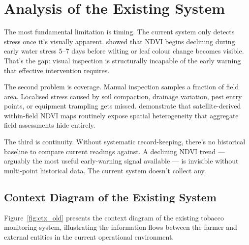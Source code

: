 \documentclass[12pt,a4paper]{report}
\begin{document}
\section{Analysis of the Existing System}

The most fundamental limitation is timing. The current system only detects stress once it's visually apparent. \citet{tucker1979} showed that NDVI begins declining during early water stress 5--7 days before wilting or leaf colour change becomes visible. That's the gap: visual inspection is structurally incapable of the early warning that effective intervention requires.

The second problem is coverage. Manual inspection samples a fraction of field area. Localised stress caused by soil compaction, drainage variation, pest entry points, or equipment trampling gets missed. \citet{weiss2020} demonstrate that satellite-derived within-field NDVI maps routinely expose spatial heterogeneity that aggregate field assessments hide entirely.

The third is continuity. Without systematic record-keeping, there's no historical baseline to compare current readings against. A declining NDVI trend — arguably the most useful early-warning signal available — is invisible without multi-point historical data. The current system doesn't collect any.

\subsection{Context Diagram of the Existing System}

Figure~\ref{fig:ctx_old} presents the context diagram of the existing tobacco monitoring system, illustrating the information flows between the farmer and external entities in the current operational environment.
\end{document}
